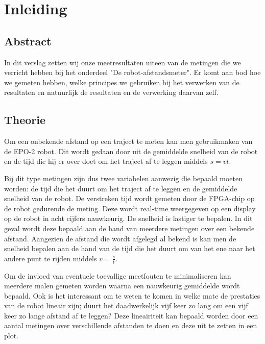 \documentclass{thema}
\begin{document}
\chapter{Inleiding}
\section{Abstract}
In dit verslag zetten wij onze meetresultaten uiteen van de metingen die we verricht hebben bij het onderdeel "De robot-afstandsmeter". Er komt aan bod hoe we gemeten hebben, welke principes we gebruiken bij het verwerken van de resultaten en natuurlijk de resultaten en de verwerking daarvan zelf.
\section{Theorie}
Om een onbekende afstand op een traject te meten kan men gebruikmaken van de EPO-2 robot. Dit wordt gedaan door uit de gemiddelde snelheid van de robot en de tijd die hij er over doet om het traject af te leggen middels $s = vt$.

Bij dit type metingen zijn dus twee variabelen aanwezig die bepaald moeten worden: de tijd die het duurt om het traject af te leggen en de gemiddelde snelheid van de robot. 
De verstreken tijd wordt gemeten door de FPGA-chip op de robot gedurende de meting. Deze wordt real-time weergegeven op een display op de robot in acht cijfers nauwkeurig.
De snelheid is lastiger te bepalen. In dit geval wordt deze bepaald aan de hand van meerdere metingen over een bekende afstand. Aangezien de afstand die wordt afgelegd al bekend is kan men de snelheid bepalen aan de hand van de tijd die het duurt om van het ene naar het andere punt te rijden middels $v=\frac{s}{t}$. 

Om de invloed van eventuele toevallige meetfouten te minimaliseren kan meerdere malen gemeten worden waarna een nauwkeurig gemiddelde wordt bepaald. Ook is het interessant om te weten te komen in welke mate de prestaties van de robot lineair zijn; duurt het daadwerkelijk vijf keer zo lang om een vijf keer zo lange afstand af te leggen? Deze lineairiteit kan bepaald worden door een aantal metingen over verschillende afstanden te doen en deze uit te zetten in een plot.
\end{document}
